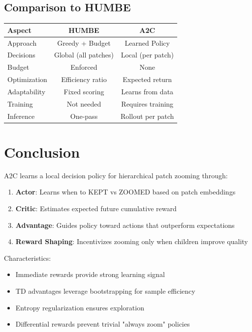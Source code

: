 \documentclass[11pt]{article}
\begin{document}
\subsection{Comparison to HUMBE}

\begin{center}
\begin{tabular}{lcc}
\hline
\textbf{Aspect} & \textbf{HUMBE} & \textbf{A2C} \\
\hline
Approach & Greedy + Budget & Learned Policy \\
Decisions & Global (all patches) & Local (per patch) \\
Budget & Enforced & None \\
Optimization & Efficiency ratio & Expected return \\
Adaptability & Fixed scoring & Learns from data \\
Training & Not needed & Requires training \\
Inference & One-pass & Rollout per patch \\
\hline
\end{tabular}
\end{center}

\section{Conclusion}

A2C learns a local decision policy for hierarchical patch zooming through:
\begin{enumerate}
    \item \textbf{Actor}: Learns when to KEPT vs ZOOMED based on patch embeddings
    \item \textbf{Critic}: Estimates expected future cumulative reward
    \item \textbf{Advantage}: Guides policy toward actions that outperform expectations
    \item \textbf{Reward Shaping}: Incentivizes zooming only when children improve quality
\end{enumerate}

Characteristics:
\begin{itemize}[nosep]
    \item Immediate rewards provide strong learning signal
    \item TD advantages leverage bootstrapping for sample efficiency
    \item Entropy regularization ensures exploration
    \item Differential rewards prevent trivial "always zoom" policies
\end{itemize}
\end{document}
